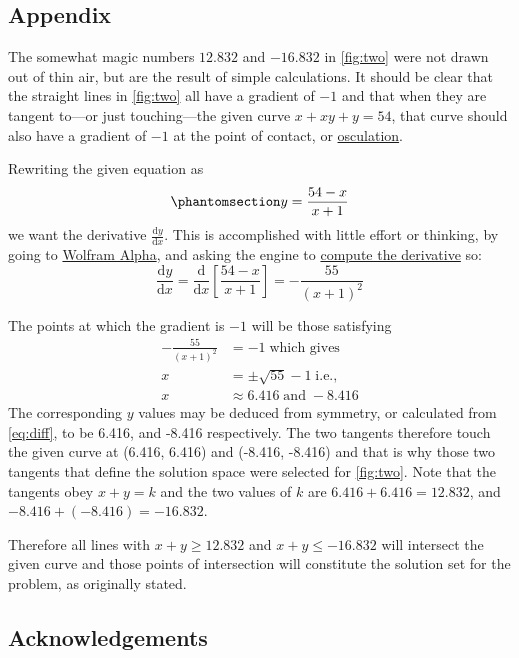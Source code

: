 \documentclass[
  a4paper,
]{article}
\begin{document}
\subsection{Appendix}\label{appendix}

The somewhat magic numbers \(12.832\) and \(-16.832\) in \cref{fig:two}
were not drawn out of thin air, but are the result of simple
calculations. It should be clear that the straight lines in
\cref{fig:two} all have a gradient of \(-1\) and that when they are
tangent to---or just touching---the given curve \(x + xy + y = 54\),
that curve should also have a gradient of \(-1\) at the point of
contact, or
\href{https://en.wikipedia.org/wiki/Osculating_curve}{osculation}.

Rewriting the given equation as
\begin{equation}\phantomsection\label{eq:diff}{
y = \frac{54-x}{x+1}
}\end{equation} we want the derivative
\(\frac{\mathrm{d}y}{\mathrm{d}x}\). This is accomplished with little
effort or thinking, by going to
\href{https://www.wolframalpha.com}{Wolfram Alpha}, and asking the
engine to
\href{https://www.wolframalpha.com/calculators/derivative-calculator/}{compute
the derivative} so: \[
\frac{\mathrm{d}y}{\mathrm{d}x} = \frac{\mathrm{d}}{\mathrm{d}x}\left[\frac{54 - x}{x + 1}\right] = -\frac{55}{(x + 1)^2}
\]

The points at which the gradient is \(-1\) will be those satisfying \[
\begin{aligned}
-\frac{55}{(x+1)^2} &= -1 \; \mbox{which gives}\\
x &= \pm\sqrt{55} - 1 \; \mbox{i.e.,}\\
x &\approx 6.416 \;\mbox{and}\; -8.416
\end{aligned}
\] The corresponding \(y\) values may be deduced from symmetry, or
calculated from \cref{eq:diff}, to be 6.416, and -8.416 respectively.
The two tangents therefore touch the given curve at (6.416, 6.416) and
(-8.416, -8.416) and that is why those two tangents that define the
solution space were selected for \cref{fig:two}. Note that the tangents
obey \(x + y = k\) and the two values of \(k\) are
\(6.416 + 6.416 = 12.832\), and \(-8.416 + (-8.416) = -16.832\).

Therefore all lines with \(x + y \geq 12.832\) and
\(x + y \leq -16.832\) will intersect the given curve and those points
of intersection will constitute the solution set for the problem, as
originally stated.

\subsection{Acknowledgements}\label{acknowledgements}
\end{document}

